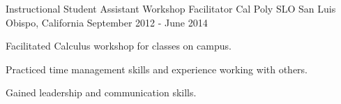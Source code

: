\begin{cventries}

\cventry
{Instructional Student Assistant Workshop Facilitator} %
{Cal Poly SLO} %
{San Luis Obispo, California} %
{September 2012 - June 2014} %
{ %
\begin{cvitems}
\item {Facilitated Calculus workshop for classes on campus.}
\item {Practiced time management skills and experience working with others.}
\item {Gained leadership and communication skills.}
\end{cvitems}
}






\end{cventries}